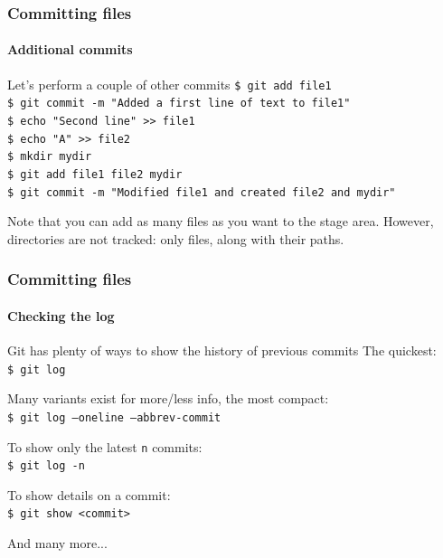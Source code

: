\begin{frame}
\frametitle{Committing files}
\framesubtitle{Additional commits}

\begin{block}{Let's perform a couple of other commits}
\texttt{\$ git add file1} \\
\texttt{\$ git commit -m "Added a first line of text to file1"} \\
\texttt{\$ echo "Second line" >\;\!\!> file1} \\
\texttt{\$ echo "A" >\;\!\!> file2} \\ 
\texttt{\$ mkdir mydir} \\ 
\texttt{\$ git add file1 file2 mydir} \\
\texttt{\$ git commit -m "Modified file1 and created file2 and mydir"} 

\medskip
Note that you can add as many files as you want to the stage area. However, directories are not tracked: only files, along with their paths.
\end{block}

\end{frame}

\begin{frame}
\frametitle{Committing files}
\framesubtitle{Checking the log}

\begin{block}{Git has plenty of ways to show the history of previous commits}
The quickest: \\
\texttt{\$ git log}

\medskip
Many variants exist for more/less info, the most compact: \\
\texttt{\$ git log ---oneline ---abbrev-commit} 

\medskip
To show only the latest \texttt{n} commits: \\
\texttt{\$ git log -n}

\medskip
To show details on a commit: \\
\texttt{\$ git show <commit>}

\medskip

And many more...
\end{block}
\end{frame}

